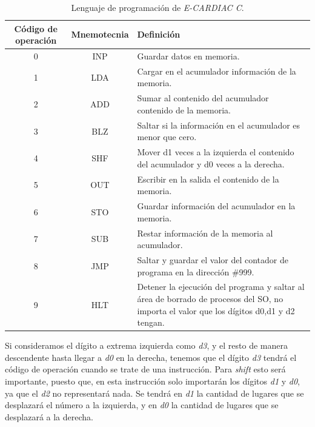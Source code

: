 \documentclass[letterpaper,12pt,oneside]{book}
\begin{document}
		
		
			\begin{table}[h]
			  \centering
			  \begin{tabular}{|c|c|p{8cm}|}
			    \hline
		    	\textbf{Código de operación} & \textbf{Mnemotecnia} & \textbf{Definición} \\
			    \hline
			    0 & INP & Guardar datos en memoria.\\
			    \hline
				1 & LDA & Cargar en el acumulador información de la memoria.\\
				\hline
			    2 & ADD & Sumar al contenido del acumulador contenido de la memoria.\\
			    \hline
			    3 & BLZ & Saltar si la información en el acumulador es menor que cero.\\
			    \hline
			    4 & SHF & Mover d1 veces a la izquierda el contenido del acumulador y d0 veces a la derecha.\\
			    \hline
			    5 & OUT & Escribir en la salida el contenido de la memoria.\\
			    \hline
			    6 & STO & Guardar información del acumulador en la memoria.\\
			    \hline
			    7 & SUB & Restar información de la memoria al acumulador.\\
			    \hline
			    8 & JMP & Saltar y guardar el valor del contador de programa en la dirección \#999. \\
			    \hline
			    9 & HLT & Detener la ejecución del programa y saltar al área de borrado de procesos del SO, no importa el valor que los dígitos d0,d1 y d2 tengan.\\
			    \hline
			  \end{tabular}
			  \caption{Lenguaje de programación de \textit{E-CARDIAC C}.}
			  \label{tab:programing_language_ecc}
			\end{table}
 
		
		Si consideramos el dígito a extrema izquierda como \textit{d3}, y el resto de manera descendente
		hasta llegar a \textit{d0} en la derecha, tenemos que el dígito \textit{d3} tendrá el código de operación cuando se trate de una instrucción. 
		Para \textit{shift} esto será importante, puesto que, en esta instrucción solo importarán los dígitos \textit{d1} y \textit{d0}, ya que el 	
		\textit{d2} no representará nada. Se tendrá en \textit{d1} la cantidad de lugares que se desplazará el número a la izquierda, y 
		en \textit{d0} la cantidad de lugares que se desplazará a la derecha.
		
\end{document}
